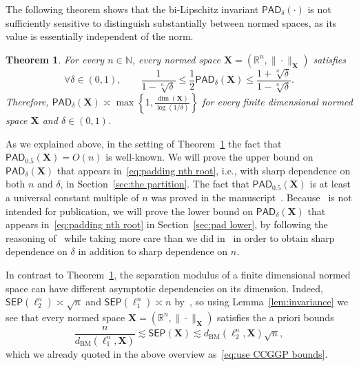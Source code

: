 \documentclass[11pt,reqno]{amsart}
\renewcommand{\le}{\leqslant}
\renewcommand{\d}{\delta}
\newcommand{\X}{\mathbf X}
\newcommand{\R}{\mathbb R}
\newtheorem{theorem}{Theorem}
\theoremstyle{remark}
\newcommand{\N}{\mathbb N}
\newcommand{\BM}{\mathrm{BM}}
\renewcommand{\1}{\mathbf 1}
\newcommand{\sep}{\mathsf{SEP}}
\newcommand{\pad}{\mathsf{PAD}}
\begin{document}
The following theorem shows that the bi-Lipschitz invariant $\pad_\d(\cdot)$ is not sufficiently sensitive to distinguish substantially between normed spaces, as its value is essentially independent of the norm.
\begin{theorem}\label{thm:pad sharp} For every $n\in \N$, every normed space $\X=(\R^n,\|\cdot\|_{\X})$ satisfies
\begin{equation}\label{eq:padding nth root}
\forall  \d\in (0,1),\qquad \frac{1}{1-\sqrt[n]{\d}}\le  \frac12 \pad_\d(\X)\le \frac{1+\sqrt[n]{\d}}{1-\sqrt[n]{\d}}.
\end{equation}
Therefore, $\pad_\d(\X)\asymp \max\left\{1,\frac{\dim(\X)}{\log\left(1/\d\right)}\right\}$ for every finite dimensional normed space $\X$ and $\d\in (0,1)$.
\end{theorem}
As we explained above, in the setting of Theorem~\ref{thm:pad sharp} the fact that $\pad_{0.5}(\X)=O(n)$ is well-known. We will prove the upper bound on $\pad_\d(\X)$ that appears in~\eqref{eq:padding nth root}, i.e., with sharp dependence on both $n$ and $\d$, in Section~\ref{sec:the partition}. The fact that $\pad_{0.5}(\X)$  is at least a universal constant multiple of $n$ was proved in the manuscript~\cite{LN03}. Because~\cite{LN03} is not intended for publication, we will prove the lower bound on  $\pad_\d(\X)$  that appears in~\eqref{eq:padding nth root} in Section~\ref{sec:pad lower}, by following the reasoning of~\cite{LN03} while taking more care than we did in~\cite{LN03} in order to obtain sharp dependence on $\d$ in addition to sharp dependence on $n$.


 In contrast to Theorem~\ref{thm:pad sharp}, the separation modulus of a finite dimensional normed space  can have different asymptotic dependencies  on its dimension. Indeed,    $\sep(\ell_2^n)\asymp\sqrt{n}$  and $\sep(\ell_1^n)\asymp n$ by~\cite{CCGGP98}, so using Lemma~\ref{lem:invariance} we see that every normed space $\X=(\R^n,\|\cdot\|_\X)$ satisfies the a priori bounds
\begin{equation}\label{eq:a priori with BM}
\frac{n}{d_{\BM}(\ell_1^n,\X)}\lesssim \sep(\X)\lesssim d_{\BM}(\ell_2^n,\X)\sqrt{n},
\end{equation}
 which we already quoted in the above overview as~\eqref{eq:use CCGGP bounds}.
\end{document}
